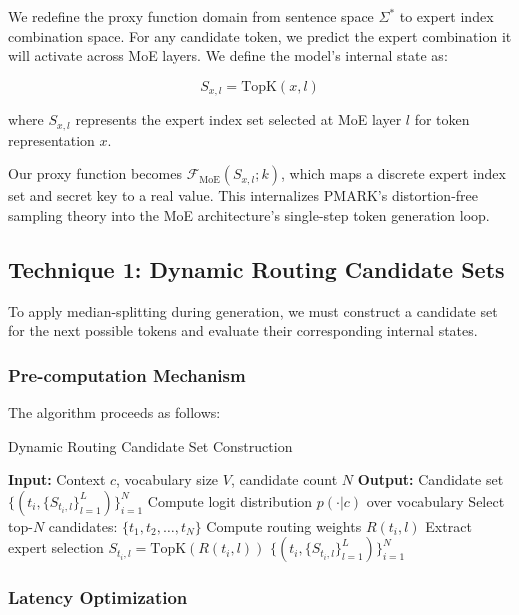 \documentclass[letterpaper,twocolumn,10pt]{article}
\begin{document}
We redefine the proxy function domain from sentence space $\Sigma^*$ to expert index combination space. For any candidate token, we predict the expert combination it will activate across MoE layers. We define the model's internal state as:

\begin{equation}
S_{x,l} = \text{TopK}(x, l)
\end{equation}

where $S_{x,l}$ represents the expert index set selected at MoE layer $l$ for token representation $x$.

Our proxy function becomes $\mathcal{F}_{\text{MoE}}(S_{x,l}; k)$, which maps a discrete expert index set and secret key to a real value. This internalizes PMARK's distortion-free sampling theory into the MoE architecture's single-step token generation loop.

\subsection{Technique 1: Dynamic Routing Candidate Sets}

To apply median-splitting during generation, we must construct a candidate set for the next possible tokens and evaluate their corresponding internal states.

\subsubsection{Pre-computation Mechanism}

The algorithm proceeds as follows:

\begin{algorithm}
\caption{Dynamic Routing Candidate Set Construction}
\begin{algorithmic}[1]
\STATE \textbf{Input:} Context $c$, vocabulary size $V$, candidate count $N$
\STATE \textbf{Output:} Candidate set $\{(t_i, \{S_{t_i,l}\}_{l=1}^L)\}_{i=1}^N$
\STATE Compute logit distribution $p(\cdot|c)$ over vocabulary
\STATE Select top-$N$ candidates: $\{t_1, t_2, \ldots, t_N\}$
        \STATE Compute routing weights $R(t_i, l)$
        \STATE Extract expert selection $S_{t_i,l} = \text{TopK}(R(t_i, l))$
    \ENDFOR
\ENDFOR
\RETURN $\{(t_i, \{S_{t_i,l}\}_{l=1}^L)\}_{i=1}^N$
\end{algorithmic}
\end{algorithm}

\subsubsection{Latency Optimization}
\end{document}
